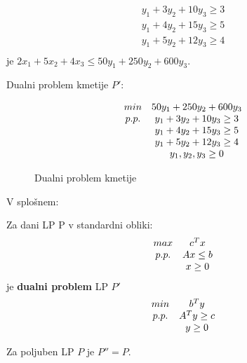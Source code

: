 \documentclass[11pt, a4paper]{article}
\begin{document}
    \[
        \begin{array}{c}
            y_1+3y_2+10y_3 \ge 3 \\
            y_1+4y_2+15y_3 \ge 5 \\
            y_1+5y_2+12y_3 \ge 4 \\ 
        \end{array}
    \]
    je \(2x_1+5x_2+4x_3 \le 50y_1+250y_2+600y_3\).

    Dualni problem kmetije \(P'\):
    \begin{figure}[h!]
        \[
            \begin{array}{ c c }
                min & 50 y_1+250y_2+600y_3 \\
                p.p. & y_1+3y_2+10y_3 \ge 3 \\
                & y_1+4y_2+15y_3 \ge 5 \\
                & y_1+5y_2+12y_3 \ge 4 \\
                & y_1,y_2,y_3 \ge 0 \\
            \end{array}
        \]
        \caption{Dualni problem kmetije}
    \end{figure}

    V splošnem:
    \begin{definition}[Dualni LP]
        Za dani LP P v standardni obliki:
        \[
            \begin{array}{ c c }
                max & c^Tx \\
                p.p. & Ax \le b \\
                & x \ge 0 \\
            \end{array}    
        \]
        je \textbf{dualni problem} LP \(P'\)
        \[
            \begin{array}{ c c }
                min & b^Ty \\
                p.p. & A^Ty \ge c \\
                & y \ge 0 \\
            \end{array}
        \]
    \end{definition}

    \begin{proposition}
        Za poljuben LP \(P\) je \(P''=P\).
    \end{proposition}
\end{document}
